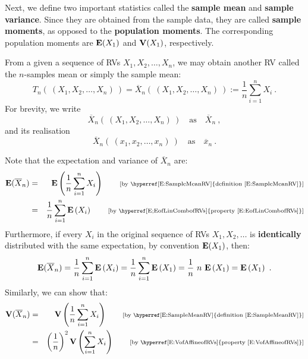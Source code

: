 Next, we define two important statistics called the {\bf sample mean} and {\bf sample variance}.  Since they are obtained from the sample data, they are called {\bf sample moments}, as opposed to the {\bf population moments}.  The corresponding population moments are $\mathbf{E}(X_1)$ and $\mathbf{V}(X_1)$, respectively.
\begin{definition}\label{D:SampleMean}
From a given a sequence of RVs $X_1,X_2,\ldots,X_n$, we may obtain another RV called the $n$-samples mean or simply the sample mean:
\begin{equation}\label{E:SampleMeanRV}
T_n( \ (X_1,X_2,\ldots,X_n) \ ) = \overline{X}_n( \ (X_1,X_2,\ldots,X_n) \ ) := \frac{1}{n} \sum_{i=1}^n X_i  \ .
\end{equation}
For brevity, we write $$\overline{X}_n( \ (X_1,X_2,\ldots,X_n) \ ) \quad \text{as} \quad \overline{X}_n \ ,$$ and its realisation $$\overline{X}_n( \ (x_1,x_2,\ldots,x_n) \ ) \quad \text{as} \quad \overline{x}_n \ .$$
\end{definition}
Note that the expectation and variance of $\overline{X}_n$ are:
\begin{eqnarray}
\e(\overline{X}_n) &=& \e \left(  \frac{1}{n} \sum_{i=1}^n X_i \right) \qquad \text{{\scriptsize[by \hyperref[E:SampleMeanRV]{definition \eqref{E:SampleMeanRV}}]}} \notag \\
&=&  \frac{1}{n} \sum_{i=1}^n \e \left( X_i \right) \qquad \text{{\scriptsize [by \hyperref[E;EofLinCombofRVs]{property \eqref{E:EofLinCombofRVs}}]}} \notag
\end{eqnarray}
Furthermore, if every $X_i$ in the original sequence of RVs $X_1,X_2,\ldots$ is {\bf identically} distributed with the same expectation, by convention $\mathbf{E}(X_1)$, then:
\begin{equation}\label{E:ExpOfSampleMeanOfIDSeq}
\e(\overline{X}_n) 
= \frac{1}{n} \sum_{i=1}^n \e \left( X_i \right)
=  \frac{1}{n} \sum_{i=1}^n \e \left( X_1 \right) 
=  \frac{1}{n} \ n \ \e \left( X_1 \right)  = \e \left( X_1 \right) \ .
\end{equation}
Similarly, we can show that:
\begin{eqnarray}
\V(\overline{X}_n) &=& \V \left(  \frac{1}{n} \sum_{i=1}^n X_i \right) \qquad \text{{\scriptsize[by \hyperref[E:SampleMeanRV]{definition \eqref{E:SampleMeanRV}}]}} \notag \\
&=& \left( \frac{1}{n} \right)^2  \V \left( \sum_{i=1}^n X_i \right) \qquad \text{{\scriptsize [by \hyperref[E:VofAffineofRVs]{property \eqref{E:VofAffineofRVs}}]}} \notag
\end{eqnarray}
